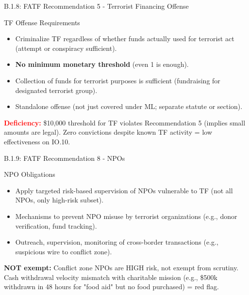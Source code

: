 \documentclass{beamer}
\begin{document}
	\begin{frame}{B.1.8: FATF Recommendation 5 - Terrorist Financing Offense}
		\begin{block}{TF Offense Requirements}
			\begin{itemize}
				\item Criminalize TF regardless of whether funds actually used for terrorist act (attempt or conspiracy sufficient).
				\item \textbf{No minimum monetary threshold} (even 1 is enough).
				\item Collection of funds for terrorist purposes is sufficient (fundraising for designated terrorist group).
				\item Standalone offense (not just covered under ML; separate statute or section).
			\end{itemize}
		\end{block}
		\textcolor{red}{\textbf{ Deficiency:}} \$10,000 threshold for TF violates Recommendation 5 (implies small amounts are legal). Zero convictions despite known TF activity = low effectiveness on IO.10.
	\end{frame}
	
	\begin{frame}{B.1.9: FATF Recommendation 8 - NPOs}
		\begin{block}{NPO Obligations}
			\begin{itemize}
				\item Apply targeted risk-based supervision of NPOs vulnerable to TF (not all NPOs, only high-risk subset).
				\item Mechanisms to prevent NPO misuse by terrorist organizations (e.g., donor verification, fund tracking).
				\item Outreach, supervision, monitoring of cross-border transactions (e.g., suspicious wire to conflict zone).
			\end{itemize}
		\end{block}
		\textbf{NOT exempt:} Conflict zone NPOs are HIGH risk, not exempt from scrutiny. Cash withdrawal velocity mismatch with charitable mission (e.g., \$500k withdrawn in 48 hours for "food aid" but no food purchased) = red flag.
	\end{frame}
	
\end{document}
